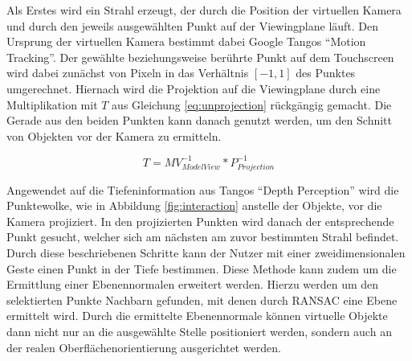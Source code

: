 Als Erstes wird ein Strahl erzeugt, der durch die Position der virtuellen Kamera und durch den jeweils ausgewählten Punkt auf der Viewingplane läuft. Den Ursprung der virtuellen Kamera bestimmt dabei Google Tangos \enquote{Motion Tracking}. Der gewählte beziehungsweise berührte Punkt auf dem Touchscreen wird dabei zunächst von Pixeln in das Verhältnis \(\left[-1,1\right]\) des Punktes umgerechnet. Hiernach wird die Projektion auf die Viewingplane durch eine Multiplikation mit \(T\) aus Gleichung \ref{eq:unprojection} rückgängig gemacht. Die Gerade aus den beiden Punkten kann danach genutzt werden, um den Schnitt von Objekten vor der Kamera zu ermitteln. \citep{OpenG86:online} 

\begin{equation} \label{eq:unprojection}
T  = MV_{ModelView}^{-1} * P_{Projection}^{-1}
\end{equation}

Angewendet auf die Tiefeninformation aus Tangos \enquote{Depth Perception} wird die Punktewolke, wie in Abbildung \ref{fig:interaction} anstelle der Objekte, vor die Kamera projiziert. In den projizierten Punkten wird danach der entsprechende Punkt gesucht, welcher sich am nächsten am zuvor bestimmten Strahl befindet. Durch diese beschriebenen Schritte kann der Nutzer mit einer zweidimensionalen Geste einen Punkt in der Tiefe bestimmen. Diese Methode kann zudem um die Ermittlung einer Ebenennormalen erweitert werden. Hierzu werden um den selektierten Punkte Nachbarn gefunden, mit denen durch RANSAC eine Ebene ermittelt wird. Durch die ermittelte Ebenennormale können virtuelle Objekte dann nicht nur an die ausgewählte Stelle positioniert werden, sondern auch an der realen Oberflächenorientierung ausgerichtet werden.

